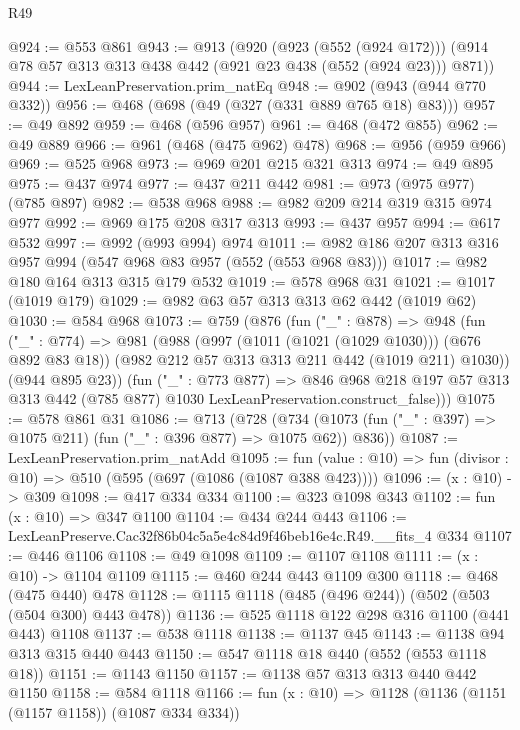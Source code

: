 \begin{lexlean}{R49}
\begin{coremodule}
@924 := @553 @861
@943 := @913
    (@920
      (@923 (@552 (@924 @172)))
      (@914 @78 @57 @313 @313 @438 @442 (@921 @23 @438 (@552 (@924 @23))) @871))
@944 := LexLeanPreservation.prim_natEq
@948 := @902 (@943 (@944 @770 @332))
@956 := @468 (@698 (@49 (@327 (@331 @889 @765 @18) @83)))
@957 := @49 @892
@959 := @468 (@596 @957)
@961 := @468 (@472 @855)
@962 := @49 @889
@966 := @961 (@468 (@475 @962) @478)
@968 := @956 (@959 @966)
@969 := @525 @968
@973 := @969 @201 @215 @321 @313
@974 := @49 @895
@975 := @437 @974
@977 := @437 @211 @442
@981 := @973 (@975 @977) (@785 @897)
@982 := @538 @968
@988 := @982 @209 @214 @319 @315 @974 @977
@992 := @969 @175 @208 @317 @313
@993 := @437 @957
@994 := @617 @532
@997 := @992 (@993 @994) @974
@1011 := @982 @186 @207 @313 @316 @957 @994 (@547 @968 @83 @957 (@552 (@553 @968 @83)))
@1017 := @982 @180 @164 @313 @315 @179 @532
@1019 := @578 @968 @31
@1021 := @1017 (@1019 @179)
@1029 := @982 @63 @57 @313 @313 @62 @442 (@1019 @62)
@1030 := @584 @968
@1073 := @759
    (@876
      (fun ("_" : @878) =>
      @948
        (fun ("_" : @774) =>
        @981
          (@988
            (@997 (@1011 (@1021 (@1029 @1030))) (@676 @892 @83 @18))
            (@982 @212 @57 @313 @313 @211 @442 (@1019 @211) @1030))
          (@944 @895 @23))
        (fun ("_" : @773 @877) =>
        @846
          @968
          @218
          @197
          @57
          @313
          @313
          @442
          (@785 @877)
          @1030
          LexLeanPreservation.construct_false)))
@1075 := @578 @861 @31
@1086 := @713
    (@728 (@734 (@1073 (fun ("_" : @397) => @1075 @211) (fun ("_" : @396 @877) => @1075 @62)) @836))
@1087 := LexLeanPreservation.prim_natAdd
@1095 := fun (value : @10) => fun (divisor : @10) => @510 (@595 (@697 (@1086 (@1087 @388 @423))))
@1096 := (x : @10) -> @309
@1098 := @417 @334 @334
@1100 := @323 @1098 @343
@1102 := fun (x : @10) => @347 @1100
@1104 := @434 @244 @443
@1106 := LexLeanPreserve.Cac32f86b04c5a5e4c84d9f46beb16e4c.R49.__fits_4 @334
@1107 := @446 @1106
@1108 := @49 @1098
@1109 := @1107 @1108
@1111 := (x : @10) -> @1104 @1109
@1115 := @460 @244 @443 @1109 @300
@1118 := @468 (@475 @440) @478
@1128 := @1115 @1118 (@485 (@496 @244)) (@502 (@503 (@504 @300) @443 @478))
@1136 := @525 @1118 @122 @298 @316 @1100 (@441 @443) @1108
@1137 := @538 @1118
@1138 := @1137 @45
@1143 := @1138 @94 @313 @315 @440 @443
@1150 := @547 @1118 @18 @440 (@552 (@553 @1118 @18))
@1151 := @1143 @1150
@1157 := @1138 @57 @313 @313 @440 @442 @1150
@1158 := @584 @1118
@1166 := fun (x : @10) => @1128 (@1136 (@1151 (@1157 @1158)) (@1087 @334 @334))

\end{coremodule}
\end{lexlean}

